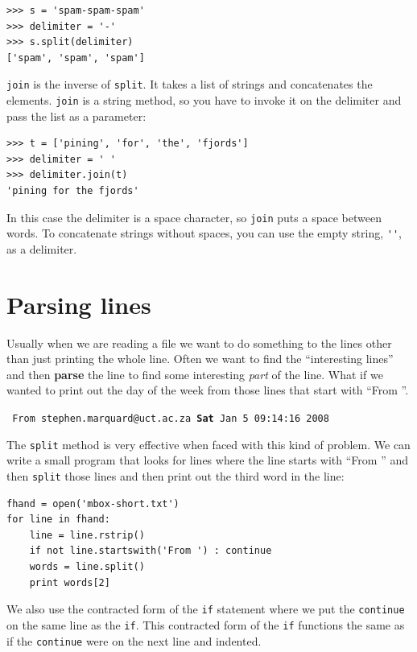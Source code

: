 \documentclass[10pt]{book}
\begin{document}
\beforeverb
\begin{verbatim}
>>> s = 'spam-spam-spam'
>>> delimiter = '-'
>>> s.split(delimiter)
['spam', 'spam', 'spam']
\end{verbatim}
\afterverb
%
{\tt join} is the inverse of {\tt split}.  It
takes a list of strings and
concatenates the elements.  {\tt join} is a string method,
so you have to invoke it on the delimiter and pass the
list as a parameter:


\beforeverb
\begin{verbatim}
>>> t = ['pining', 'for', 'the', 'fjords']
>>> delimiter = ' '
>>> delimiter.join(t)
'pining for the fjords'
\end{verbatim}
\afterverb
%
In this case the delimiter is a space character, so
{\tt join} puts a space between words.  To concatenate
strings without spaces, you can use the empty string,
\verb"''", as a delimiter. 



\section{Parsing lines}

Usually when we are reading a file 
we want to do something to the lines other than just 
printing the whole line.  Often we want to find the ``interesting
lines'' and then {\bf parse} the line to find some interesting
{\em part} of the line.  What if we wanted to print out the day of the 
week from those lines that start with ``From ''.

{\tt
From stephen.marquard@uct.ac.za {\bf Sat} Jan  5 09:14:16 2008
}

The {\tt split} method is very effective when faced with this 
kind of problem.
We can write a small program that looks for lines where the 
line starts with ``From '' and then {\tt split} those lines 
and then print out the third word in the line:

\beforeverb
\begin{verbatim}
fhand = open('mbox-short.txt')
for line in fhand:
    line = line.rstrip()
    if not line.startswith('From ') : continue
    words = line.split()
    print words[2]
\end{verbatim}
\afterverb
%
We also use the contracted form of the {\tt if}
statement where we put the {\tt continue } on the
same line as the {\tt if}.  This contracted form
of the {\tt if} functions the same as if the
{\tt continue} were on the next line and indented.
\end{document}
